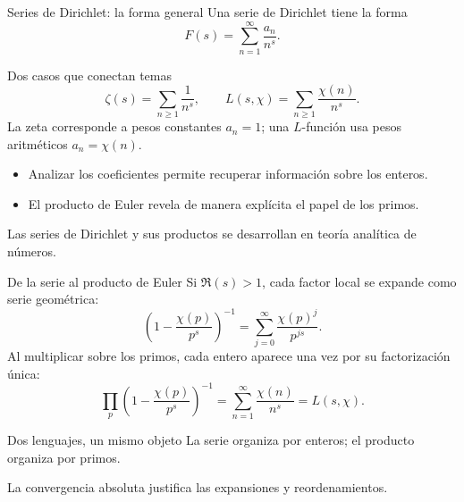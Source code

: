 \documentclass[aspectratio=169,11pt]{beamer}
\begin{document}
\begin{frame}{Series de Dirichlet: la forma general}
    Una serie de Dirichlet tiene la forma
    \[
      F(s)=\sum_{n=1}^{\infty}\frac{a_n}{n^s}.
    \]
    \begin{exampleblock}{Dos casos que conectan temas}
        \[
          \zeta(s)=\sum_{n\geq1}\frac{1}{n^s},\qquad
          L(s,\chi)=\sum_{n\geq1}\frac{\chi(n)}{n^s}.
        \]
        La zeta corresponde a pesos constantes $a_n=1$; una $L$-función usa pesos aritméticos $a_n=\chi(n)$.
    \end{exampleblock}
    \begin{itemize}
        \item Analizar los coeficientes permite recuperar información sobre los enteros.
        \item El producto de Euler revela de manera explícita el papel de los primos.
    \end{itemize}
    \centering\small Las series de Dirichlet y sus productos se desarrollan en teoría analítica de números.\;\cite[Capítulos 6--7]{Apostol1976-xj}
\end{frame}

\begin{frame}{De la serie al producto de Euler}
    Si $\Re(s)>1$, cada factor local se expande como serie geométrica:
    \[
      \left(1-\frac{\chi(p)}{p^s}\right)^{-1}
      =\sum_{j=0}^{\infty}\frac{\chi(p)^j}{p^{js}}.
    \]
    Al multiplicar sobre los primos, cada entero aparece una vez por su factorización única:
    \[
      \prod_p\left(1-\frac{\chi(p)}{p^s}\right)^{-1}
      =\sum_{n=1}^{\infty}\frac{\chi(n)}{n^s}=L(s,\chi).
    \]
    \begin{alertblock}{Dos lenguajes, un mismo objeto}
        La serie organiza por enteros; el producto organiza por primos.
    \end{alertblock}
    \centering\small La convergencia absoluta justifica las expansiones y reordenamientos.\;\cite[Capítulo 7]{Apostol1976-xj}
\end{frame}
\end{document}
